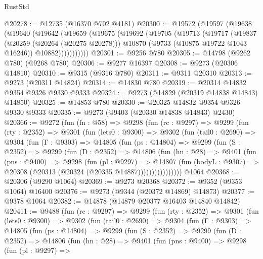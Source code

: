 \begin{lexlean}{RustStd}
\begin{coremodule}
{\begin{coremodule}
{{{{{{{{{{{{{{{{{{{{{{{{{{{{{{{{{{{{{{{{{{{{{{{{{{{{{{{@20278 := @12735 (@16370 @702 @4181)
@20300 := @19572
    (@19597
      (@19638
        (@19640
          (@19642
            (@19659
              (@19675
                (@19692
                  (@19705
                    (@19713
                      (@19717
                        (@19837
                          (@20259 (@20264 (@20275 @20278)))
                          @10870
                          (@9733 (@10875 @19722 @1043 @16246))
                          @10882)))))))))))
@20301 := @9256 @780
@20305 := @14798 (@9262 @780) (@9268 @780)
@20306 := @9277 @16397
@20308 := @9273 (@20306 @14810)
@20310 := @9315 (@9316 @780)
@20311 := @9311 @20310
@20313 := @9273 (@20311 @14824)
@20314 := @14830 @780
@20319 := @20314 @14832 @9354 @9326 @9330 @9333
@20324 := @9273 (@14829 (@20319 @14838 @14843) @14850)
@20325 := @14853 @780
@20330 := @20325 @14832 @9354 @9326 @9330 @9333
@20335 := @9273 (@9403 (@20330 @14838 @14843) @2430)
@20366 := @9272
    (fun (fn : @58) =>
    @9298
      (fun (rc : @9297) =>
      @9299
        (fun (rty : @2352) =>
        @9301
          (fun (lets0 : @9300) =>
          @9302
            (fun (tail0 : @2690) =>
            @9304
              (fun (Γ : @9303) =>
              @14805
                (fun (ps : @14804) =>
                @9299
                  (fun (S : @2352) =>
                  @9299
                    (fun (D : @2352) =>
                    @14806
                      (fun (hn : @28) =>
                      @9401
                        (fun (pns : @9400) =>
                        @9298
                          (fun (pl : @9297) =>
                          @14807
                            (fun (bodyL : @9307) =>
                            @20308 (@20313 (@20324 (@20335 @14887))))))))))))))))
    @1064
@20368 := @20306 (@9290 @1064)
@20369 := @9273 @20368
@20372 := @9352 (@9353 @1064) @16400
@20376 := @9273 (@9344 (@20372 @14869) @14873)
@20377 := @9378 @1064
@20382 := @14878 (@14879 @20377 @16403 @14840 @14842)
@20411 := @9488
    (fun (rc : @9297) =>
    @9299
      (fun (rty : @2352) =>
      @9301
        (fun (lets0 : @9300) =>
        @9302
          (fun (tail0 : @2690) =>
          @9304
            (fun (Γ : @9303) =>
            @14805
              (fun (ps : @14804) =>
              @9299
                (fun (S : @2352) =>
                @9299
                  (fun (D : @2352) =>
                  @14806
                    (fun (hn : @28) =>
                    @9401
                      (fun (pns : @9400) =>
                      @9298
                        (fun (pl : @9297) =>
}}}}}}}}}}}}}}}}}}}}}}}}}}}}}}}}}}}}}}}}}}}}}}}}}}}}}}}
\end{coremodule}}
\end{coremodule}
\end{lexlean}
